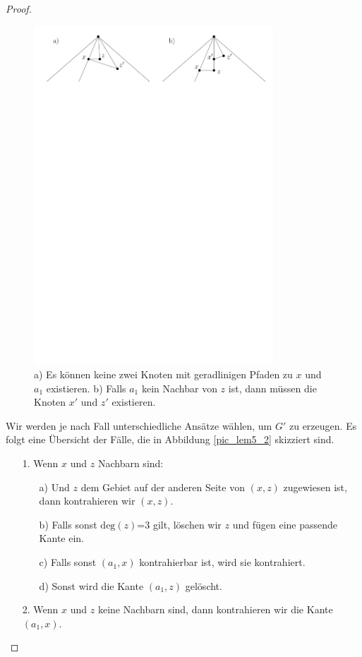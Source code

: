 \begin{proof}
\begin{figure}[h]
	\centering
	  \includegraphics[width=0.8\textwidth]{lem5_1.pdf}
    	\caption{a) Es können keine zwei Knoten mit geradlinigen Pfaden zu $x$ und $a_1$ existieren. b) Falls $a_1$ kein Nachbar von $z$ ist, dann müssen die Knoten $x'$ und $z'$ existieren.}
    	\label{pic_lem5_1}
\end{figure}

Wir werden je nach Fall unterschiedliche Ansätze wählen, um $G'$ zu erzeugen. Es folgt eine Übersicht der Fälle, die in Abbildung \ref{pic_lem5_2} skizziert sind.

\begin{itemize}
\item [1.] Wenn $x$ und $z$ Nachbarn sind:
	\begin{itemize}
	\item [a)] Und $z$ dem Gebiet auf der anderen Seite von $(x,z)$ zugewiesen ist, dann kontrahieren wir $(x,z)$.
	\item [b)] Falls sonst $\text{deg}(z)$=3 gilt, löschen wir $z$ und fügen eine passende Kante ein.
	\item [c)] Falls sonst $(a_1,x)$ kontrahierbar ist, wird sie kontrahiert.
	\item [d)] Sonst wird die Kante $(a_1,z)$ gelöscht.
	\end{itemize}
\item [2.] Wenn $x$ und $z$ keine Nachbarn sind, dann kontrahieren wir die Kante $(a_1,x)$.
\end{itemize} 


\end{proof}

